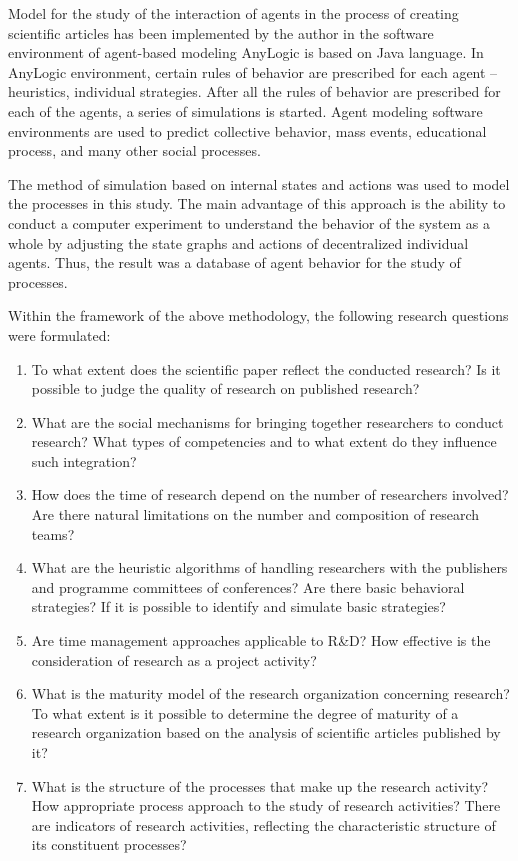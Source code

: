 \documentclass[12pt]{report}
\theoremstyle{definition}
\begin{document}
Model for the study of the interaction of agents in the process of creating scientific articles has been implemented by the author in the software environment of agent-based modeling AnyLogic is based on Java language. 
In AnyLogic environment, certain rules of behavior are prescribed for each agent – heuristics, individual strategies.
After all the rules of behavior are prescribed for each of the agents, a series of simulations is started.
Agent modeling software environments are used to predict collective behavior, mass events, educational process, and many other social processes.

The method of simulation based on internal states and actions was used to model the processes in this study.
The main advantage of this approach is the ability to conduct a computer experiment to understand the behavior of the system as a whole by adjusting the state graphs and actions of decentralized individual agents. 
Thus, the result was a database of agent behavior for the study of processes.

Within the framework of the above methodology, the following research questions were formulated:
\begin{enumerate}
	\item To what extent does the scientific paper reflect the conducted research? Is it possible to judge the quality of research on published research?
	\item What are the social mechanisms for bringing together researchers to conduct research? What types of competencies and to what extent do they influence such integration?
	\item How does the time of research depend on the number of researchers involved? Are there natural limitations on the number and composition of research teams?
	\item What are the heuristic algorithms of handling researchers with the publishers and programme committees of conferences? Are there basic behavioral strategies? If it is possible to identify and simulate basic strategies?
	\item Are time management approaches applicable to R\&D? How effective is the consideration of research as a project activity?
	\item What is the maturity model of the research organization concerning research? To what extent is it possible to determine the degree of maturity of a research organization based on the analysis of scientific articles published by it?
	\item What is the structure of the processes that make up the research activity? How appropriate process approach to the study of research activities? There are indicators of research activities, reflecting the characteristic structure of its constituent processes?
\end{enumerate}
\end{document}
